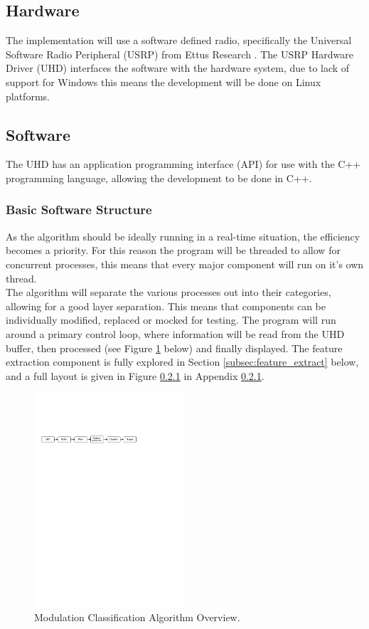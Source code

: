 \documentclass[10pt,twocolumn]{witseiepaper}
\begin{document}
	\subsection{Hardware}
		The implementation will use a software defined radio, specifically the Universal Software Radio Peripheral (USRP) from Ettus Research \cite{ettus}. The USRP Hardware Driver (UHD) interfaces the software with the hardware system, due to lack of support for Windows this means the development will be done on Linux platforms.

	\subsection{Software}
	The UHD has an application programming interface (API) for use with the C++ programming language, allowing the development to be done in C++.
		\subsubsection{Basic Software Structure}
			As the algorithm should be ideally running in a real-time situation, the efficiency becomes a priority. For this reason the program will be threaded to allow for concurrent processes, this means that every major component will run on it's own thread.\\[11pt]
			The algorithm will separate the various processes out into their categories, allowing for a good layer separation. This means that components can be individually modified, replaced or mocked for testing. The program will run around a primary control loop, where information will be read from the UHD buffer, then processed (see Figure \ref{fig:sw_overview} below) and finally displayed. The feature extraction component is fully explored in Section \ref{subsec:feature_extract} below, and a full layout is given in Figure \ref{} in Appendix \ref{}.
			\begin{figure}[h!]
				\centering
				\includegraphics[trim=1.2cm 31.5cm 9cm 8cm, clip=true,width=0.5\textwidth]{small.pdf}
				\caption{Modulation Classification Algorithm Overview.}
				\label{fig:sw_overview}
			\end{figure}
\end{document}
